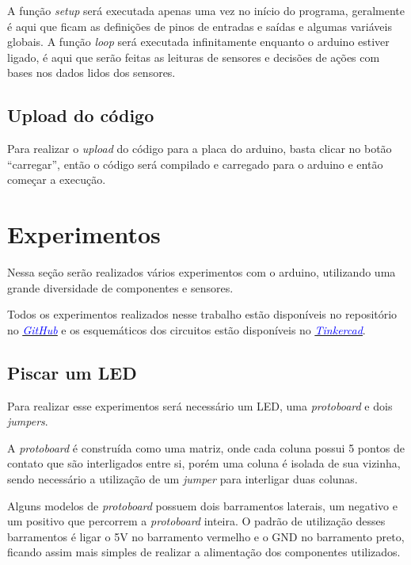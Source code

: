\documentclass[12pt]{article}
\begin{document}
	A função \textit{setup} será executada apenas uma vez no início do programa, geralmente é aqui que ficam as definições de pinos de entradas e saídas e algumas variáveis globais.
	A função \textit{loop} será executada infinitamente enquanto o arduino estiver ligado, é aqui que serão feitas as leituras de sensores e decisões de ações com bases nos dados lidos dos sensores.

\subsection{Upload do código}
	Para realizar o \textit{upload} do código para a placa do arduino, basta clicar no botão ``carregar'', então o código será compilado e carregado para o arduino e então começar a execução.

\section{Experimentos}
	Nessa seção serão realizados vários experimentos com o arduino, utilizando uma grande diversidade de componentes e sensores.

	Todos os experimentos realizados nesse trabalho estão disponíveis no repositório no \href{https://github.com/ramires352/Arduino-UEM}{\underline{\textcolor{blue}{\textit{GitHub}}}} e os esquemáticos dos circuitos estão disponíveis no \href{https://www.tinkercad.com/users/8OFhdueEmAr-rrramires?category=circuits&sort=likes&view_mode=default}{\underline{\textcolor{blue}{\textit{Tinkercad}}}}.

\subsection{Piscar um LED}
	Para realizar esse experimentos será necessário um LED, uma \textit{protoboard} e dois \textit{jumpers}.

	A \textit{protoboard} é construída como uma matriz, onde cada coluna possui 5 pontos de contato que são interligados entre si, porém uma coluna é isolada de sua vizinha, sendo necessário a utilização de um \textit{jumper} para interligar duas colunas.

	Alguns modelos de \textit{protoboard} possuem dois barramentos laterais, um negativo e um positivo que percorrem a \textit{protoboard} inteira. O padrão de utilização desses barramentos é ligar o 5V no barramento vermelho e o GND no barramento preto, ficando assim mais simples de realizar a alimentação dos componentes utilizados.
\end{document}
